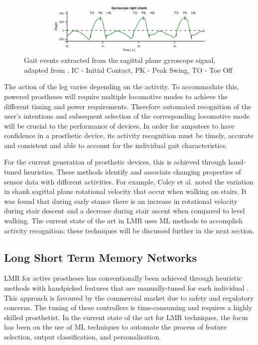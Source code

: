 \documentclass[sensors,article,submit,moreauthors,pdftex]{Definitions/mdpi}
\begin{document}
\begin{figure}[!htb]
    \centering
    \includegraphics[width=\textwidth]{Figures/gyro_trace_hs.jpg}
    \caption{Gait events extracted from the sagittal plane gyroscope signal, adapted from \cite{Sabatini2005}. IC - Initial Contact, PK - Peak Swing, TO - Toe Off}
    \label{fig:y-gyro-hs-to}
\end{figure}

The action of the leg varies depending on the activity. To accommodate this, powered prostheses will require multiple locomotive modes to achieve the different timing and power requirements. Therefore automated recognition of the user's intentions and subsequent selection of the corresponding locomotive mode will be crucial to the performance of devices\cite{Tucker2015, Windrich2016, Zhang2015}. In order for amputees to have confidence in a prosthetic device, its activity recognition must be timely, accurate and consistent and able to account for the individual gait characteristics.\cite{Pedroli2019, Sinha2011, Ponce2016}

For the current generation of prosthetic devices, this is achieved through hand-tuned heuristics. These methods identify and associate changing properties of sensor data with different activities. For example, Coley et al. noted the variation in shank sagittal plane rotational velocity that occur when walking on stairs\cite{Coley2005}. It was found that during early stance there is an increase in rotational velocity during stair descent and a decrease during stair ascent when compared to level walking. The current state of the art in LMR uses ML methods to accomplish activity recognition; these techniques will be discussed further in the next section.




\subsection{Long Short Term Memory Networks}
\label{sec:lstm_therory}
LMR for active prostheses has conventionally been achieved through heuristic methods with handpicked features that are manually-tuned for each individual \cite{Maqbool2017, Xu2018}. This approach is favoured by the commercial market due to safety and regulatory concerns\cite{Fluit2020}.  The tuning of these controllers is time-consuming and requires a highly skilled prosthetist. In the current state of the art for LMR techniques, the focus has been on the use of ML techniques to automate the process of feature selection, output classification, and personalisation\cite{Labarriere2020}.
\end{document}
